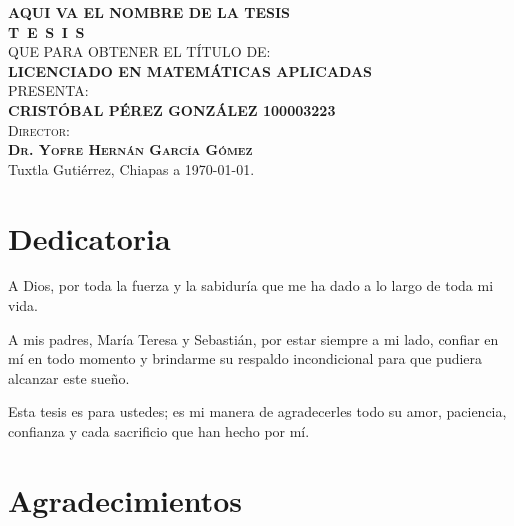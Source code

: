 \documentclass[
  spanish,
  us-letterpaper,
]{scrreprt}
\numberwithin{equation}{section}
\theoremstyle{plain}
\theoremstyle{plain}
\theoremstyle{plain}
\theoremstyle{definition}
\theoremstyle{remark}
\begin{document}
\begin{titlepage}
\begin{minipage}[t][0.95\textheight][c]{0.76\textwidth}
            \begin{center}
                \vspace{0.7cm}
                {\Large\bfseries AQUI VA EL NOMBRE DE LA TESIS}\\[2cm]
                \textsc{\huge \textbf{T\, E\, S\, I\, S}}\\[1.5cm]
                \textsc{\large QUE PARA OBTENER EL TÍTULO DE:}\\[0.3cm]
                \textbf{\textsc{LICENCIADO EN MATEMÁTICAS APLICADAS}}\\[1.5cm]
                \textsc{\large PRESENTA:}\\[0.3cm]
                \textbf{\textsc{\large {CRISTÓBAL PÉREZ GONZÁLEZ 100003223}}}\\[2cm]
                {\large\scshape Director:\\[0.3cm]
                {\textbf{\large Dr. Yofre Hernán García Gómez }}}\\[2.0cm]
                \large{Tuxtla Gutiérrez, Chiapas a \today.}

            \end{center}
\end{minipage}
\end{titlepage}

\pagebreak[2]

\chapter*{Dedicatoria}
\begin{flushright}
\itshape
\setlength{\parindent}{0pt} %
\setlength{\parskip}{1.2\baselineskip} %

A Dios, por toda la fuerza y la sabiduría que me ha dado a lo largo de toda mi vida.

A mis padres, María Teresa y Sebastián, por estar siempre a mi lado, confiar en mí en todo momento y brindarme su respaldo incondicional para que pudiera alcanzar este sueño.

Esta tesis es para ustedes; es mi manera de agradecerles todo su amor, paciencia, confianza y cada sacrificio que han hecho por mí.
\end{flushright}


\chapter*{Agradecimientos}
\end{document}
